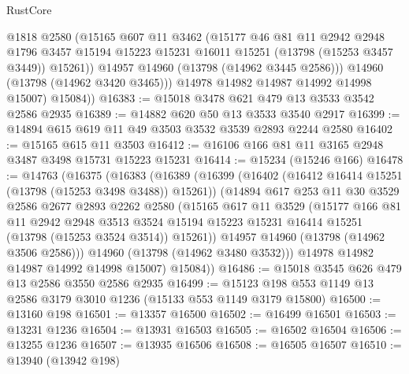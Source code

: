 \begin{lexlean}{RustCore}
\begin{coremodule}
              @1818
              @2580
              (@15165
                @607
                @11
                @3462
                (@15177
                  @46
                  @81
                  @11
                  @2942
                  @2948
                  @1796
                  @3457
                  @15194
                  @15223
                  @15231
                  @16011
                  @15251
                  (@13798 (@15253 @3457 @3449))
                  @15261))
              @14957
              @14960
              (@13798 (@14962 @3445 @2586)))
            @14960
            (@13798 (@14962 @3420 @3465)))
          @14978
          @14982
          @14987
          @14992
          @14998
          @15007)
        @15084))
@16383 := @15018 @3478 @621 @479 @13 @3533 @3542 @2586 @2935
@16389 := @14882 @620 @50 @13 @3533 @3540 @2917
@16399 := @14894 @615 @619 @11 @49 @3503 @3532 @3539 @2893 @2244 @2580
@16402 := @15165 @615 @11 @3503
@16412 := @16106 @166 @81 @11 @3165 @2948 @3487 @3498 @15731 @15223 @15231
@16414 := @15234 (@15246 @166)
@16478 := @14763
    (@16375
      (@16383
        (@16389
          (@16399
            (@16402 (@16412 @16414 @15251 (@13798 (@15253 @3498 @3488)) @15261))
            (@14894
              @617
              @253
              @11
              @30
              @3529
              @2586
              @2677
              @2893
              @2262
              @2580
              (@15165
                @617
                @11
                @3529
                (@15177
                  @166
                  @81
                  @11
                  @2942
                  @2948
                  @3513
                  @3524
                  @15194
                  @15223
                  @15231
                  @16414
                  @15251
                  (@13798 (@15253 @3524 @3514))
                  @15261))
              @14957
              @14960
              (@13798 (@14962 @3506 @2586)))
            @14960
            (@13798 (@14962 @3480 @3532)))
          @14978
          @14982
          @14987
          @14992
          @14998
          @15007)
        @15084))
@16486 := @15018 @3545 @626 @479 @13 @2586 @3550 @2586 @2935
@16499 := @15123 @198 @553 @1149 @13 @2586 @3179 @3010 @1236 (@15133 @553 @1149 @3179 @15800)
@16500 := @13160 @198
@16501 := @13357 @16500
@16502 := @16499 @16501
@16503 := @13231 @1236
@16504 := @13931 @16503
@16505 := @16502 @16504
@16506 := @13255 @1236
@16507 := @13935 @16506
@16508 := @16505 @16507
@16510 := @13940 (@13942 @198)

\end{coremodule}
\end{lexlean}
